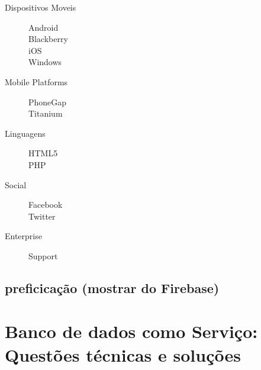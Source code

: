 \begin{description}
		\item[Dispositivos Moveis]
			\begin{description}
				\item[]
                \item[Android] {}
				\item[Blackberry] {}
				\item[iOS] {}
				\item[Windows] {}
			\end{description}

		\item[Mobile Platforms]
			\begin{description}
				\item[]
                \item[PhoneGap] {}
				\item[Titanium] {}
			\end{description}

		\item[Linguagens]
			\begin{description}
				\item[]
                \item[HTML5] {}
				\item[PHP] {}
			\end{description}

		\item[Social]
			\begin{description}
				\item[]
                \item[Facebook] {}
				\item[Twitter] {}
			\end{description}

		\item[Enterprise]
			\begin{description}
				\item[] 
                \item[Support] {}
			\end{description}
	\end{description}

	\subsection{preficicação (mostrar do Firebase)}

\section{Banco de dados como Serviço: Questões técnicas e soluções}
